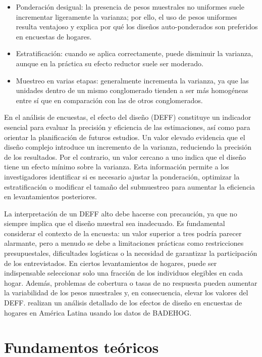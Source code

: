 \documentclass[
  spanish,
  12pt,
]{book}
\providecommand{\tightlist}{%
  \setlength{\itemsep}{0pt}\setlength{\parskip}{0pt}}
\begin{document}
\begin{itemize}
\tightlist
\item
  Ponderación desigual: la presencia de pesos muestrales no uniformes suele incrementar ligeramente la varianza; por ello, el uso de pesos uniformes resulta ventajoso y explica por qué los diseños auto-ponderados son preferidos en encuestas de hogares.
\item
  Estratificación: cuando se aplica correctamente, puede disminuir la varianza, aunque en la práctica su efecto reductor suele ser moderado.
\item
  Muestreo en varias etapas: generalmente incrementa la varianza, ya que las unidades dentro de un mismo conglomerado tienden a ser más homogéneas entre sí que en comparación con las de otros conglomerados.
\end{itemize}

En el análisis de encuestas, el efecto del diseño (DEFF) constituye un indicador esencial para evaluar la precisión y eficiencia de las estimaciones, así como para orientar la planificación de futuros estudios. Un valor elevado evidencia que el diseño complejo introduce un incremento de la varianza, reduciendo la precisión de los resultados. Por el contrario, un valor cercano a uno indica que el diseño tiene un efecto mínimo sobre la varianza. Esta información permite a los investigadores identificar si es necesario ajustar la ponderación, optimizar la estratificación o modificar el tamaño del submuestreo para aumentar la eficiencia en levantamientos posteriores.

La interpretación de un DEFF alto debe hacerse con precaución, ya que no siempre implica que el diseño muestral sea inadecuado. Es fundamental considerar el contexto de la encuesta: un valor superior a tres podría parecer alarmante, pero a menudo se debe a limitaciones prácticas como restricciones presupuestales, dificultades logísticas o la necesidad de garantizar la participación de los entrevistados. En ciertos levantamientos de hogares, puede ser indispensable seleccionar solo una fracción de los individuos elegibles en cada hogar. Además, problemas de cobertura o tasas de no respuesta pueden aumentar la variabilidad de los pesos muestrales y, en consecuencia, elevar los valores del DEFF. \citet{GutierrezBabativa2023} realizan un análisis detallado de los efectos de diseño en encuestas de hogares en América Latina usando los datos de BADEHOG.

\section{Fundamentos teóricos}\label{fundamentos-teoricos}
\end{document}
